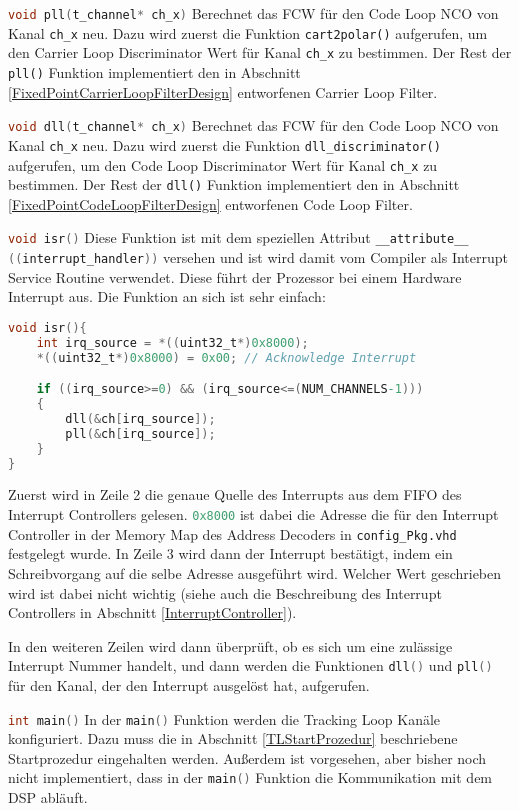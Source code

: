 \lstinline[language=C]$void pll(t_channel* ch_x)$
Berechnet das \gls{FCW} für den Code Loop \gls{NCO} von Kanal \lstinline$ch_x$ neu. Dazu wird zuerst die Funktion \lstinline$cart2polar()$ aufgerufen, um den Carrier Loop Discriminator Wert für Kanal \lstinline$ch_x$ zu bestimmen. Der Rest der \lstinline$pll()$ Funktion implementiert den in Abschnitt \ref{FixedPointCarrierLoopFilterDesign} entworfenen Carrier Loop Filter.


\lstinline[language=C]$void dll(t_channel* ch_x)$
Berechnet das \gls{FCW} für den Code Loop \gls{NCO} von Kanal \lstinline$ch_x$ neu. Dazu wird zuerst die Funktion \lstinline$dll_discriminator()$ aufgerufen, um den Code Loop Discriminator Wert für Kanal \lstinline$ch_x$ zu bestimmen. Der Rest der \lstinline$dll()$ Funktion implementiert den in Abschnitt \ref{FixedPointCodeLoopFilterDesign} entworfenen Code Loop Filter.

\lstinline[language=C]$void isr()$
Diese Funktion ist mit dem speziellen Attribut \lstinline[language=C]$__attribute__ ((interrupt_handler))$ versehen und ist wird damit vom Compiler als Interrupt Service Routine verwendet. Diese führt der Prozessor bei einem Hardware Interrupt aus. Die Funktion an sich ist sehr einfach:

\begin{lstlisting}[language=C]
void isr(){
	int irq_source = *((uint32_t*)0x8000);
	*((uint32_t*)0x8000) = 0x00; // Acknowledge Interrupt

	if ((irq_source>=0) && (irq_source<=(NUM_CHANNELS-1)))
	{
		dll(&ch[irq_source]);
		pll(&ch[irq_source]);
	}
}
\end{lstlisting}

Zuerst wird in Zeile 2 die genaue Quelle des Interrupts aus dem FIFO des Interrupt Controllers gelesen. \lstinline[language=C]$0x8000$ ist dabei die Adresse die für den Interrupt Controller in der Memory Map des Address Decoders in \lstinline$config_Pkg.vhd$ festgelegt wurde. In Zeile 3 wird dann der Interrupt bestätigt, indem ein Schreibvorgang auf die selbe Adresse ausgeführt wird. Welcher Wert geschrieben wird ist dabei nicht wichtig (siehe auch die Beschreibung des Interrupt Controllers in Abschnitt \ref{InterruptController}).

In den weiteren Zeilen wird dann überprüft, ob es sich um eine zulässige Interrupt Nummer handelt, und dann werden die Funktionen \lstinline[language=C]$dll()$ und \lstinline[language=C]$pll()$ für den Kanal, der den Interrupt ausgelöst hat, aufgerufen.

\lstinline[language=C]$int main()$
In der \lstinline[language=C]$main()$ Funktion werden die Tracking Loop Kanäle konfiguriert. Dazu muss die in Abschnitt \ref{TLStartProzedur} beschriebene Startprozedur eingehalten werden. Außerdem ist vorgesehen, aber bisher noch nicht implementiert, dass in der \lstinline[language=C]$main()$ Funktion die Kommunikation mit dem DSP abläuft. 


